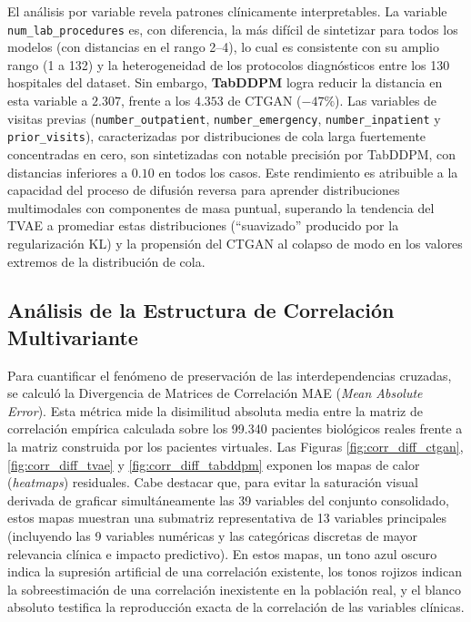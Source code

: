 El análisis por variable revela patrones clínicamente interpretables. La variable \texttt{num\_lab\_procedures} es, con diferencia, la más difícil de sintetizar para todos los modelos (con distancias en el rango 2--4), lo cual es consistente con su amplio rango (1 a 132) y la heterogeneidad de los protocolos diagnósticos entre los 130 hospitales del dataset. Sin embargo, \textbf{TabDDPM} logra reducir la distancia en esta variable a $2.307$, frente a los $4.353$ de CTGAN ($-47\%$). Las variables de visitas previas (\texttt{number\_outpatient}, \texttt{number\_emergency}, \texttt{number\_inpatient} y \texttt{prior\_visits}), caracterizadas por distribuciones de cola larga fuertemente concentradas en cero, son sintetizadas con notable precisión por TabDDPM, con distancias inferiores a $0.10$ en todos los casos. Este rendimiento es atribuible a la capacidad del proceso de difusión reversa para aprender distribuciones multimodales con componentes de masa puntual, superando la tendencia del TVAE a promediar estas distribuciones (``suavizado'' producido por la regularización KL) y la propensión del CTGAN al colapso de modo en los valores extremos de la distribución de cola.

\subsection{Análisis de la Estructura de Correlación Multivariante}

Para cuantificar el fenómeno de preservación de las interdependencias cruzadas, se calculó la Divergencia de Matrices de Correlación MAE (\textit{Mean Absolute Error}). Esta métrica mide la disimilitud absoluta media entre la matriz de correlación empírica calculada sobre los 99.340 pacientes biológicos reales frente a la matriz construida por los pacientes virtuales. Las Figuras \ref{fig:corr_diff_ctgan}, \ref{fig:corr_diff_tvae} y \ref{fig:corr_diff_tabddpm} exponen los mapas de calor (\textit{heatmaps}) residuales. Cabe destacar que, para evitar la saturación visual derivada de graficar simultáneamente las 39 variables del conjunto consolidado, estos mapas muestran una submatriz representativa de 13 variables principales (incluyendo las 9 variables numéricas y las categóricas discretas de mayor relevancia clínica e impacto predictivo). En estos mapas, un tono azul oscuro indica la supresión artificial de una correlación existente, los tonos rojizos indican la sobreestimación de una correlación inexistente en la población real, y el blanco absoluto testifica la reproducción exacta de la correlación de las variables clínicas.

